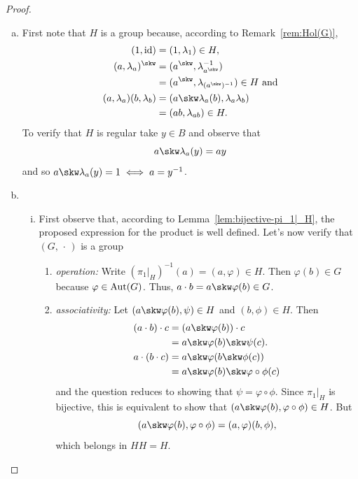 \begin{proof}${}$
    \begin{enumerate}[a),font=\upshape]
        \item First note that $H$ is a group because, according to Remark~\ref{rem:Hol(G)},
        \begin{align*}
            (1,\id) &= (1,\lambda_1)\in H,\\
            (a,\lambda_a)^\skw &= (a^\skw,\lambda^{-1}_{a^\skw})\\
                &= (a^\skw,\lambda_{(a^\skw)^{-1}})\in H
                \text{ and}\\
            (a,\lambda_a)(b,\lambda_b)
                &= (a\skw \lambda_a(b),\lambda_a\lambda_b)\\
                &= (ab,\lambda_{ab})\in H.
        \end{align*}
        To verify that $H$ is regular take $y\in B$ and observe that
        $$
            a\skw\lambda_a(y)=ay
        $$
        and so $a\skw\lambda_a(y)=1\iff a=y^{-1}$.

        \item ${}$
        \begin{enumerate}[i),font=\upshape]
            \item First observe that, according to Lemma~\ref{lem:bijective-pi_1|_H}, the proposed expression for the product is well defined. Let's now verify that $(G,\,\cdot\,)$ is a group
            \begin{enumerate}[-]
                \item \textit{operation:} Write $(\pi_1|_H)^{-1}(a)=(a,\varphi)\in H$. Then $\varphi(b)\in G$ because $\varphi\in{\rm Aut}(G)$. Thus, $a\cdot b = a\skw\varphi(b)\in G$.
                \item \textit{associativity:} Let $(a\skw\varphi(b),\psi)\in H$ and $(b,\phi)\in H$. Then
                \begin{align*}
                    (a\cdot b)\cdot c
                        &= (a\skw\varphi(b))\cdot c\\
                        &= a\skw\varphi(b)\skw\psi(c).\\
                    a\cdot(b\cdot c)
                        &= a\skw\varphi(b\skw\phi(c))\\
                        &= a\skw\varphi(b)\skw\varphi\circ\phi(c)
                \end{align*}
                and the question reduces to showing that $\psi=\varphi\circ\phi$. Since $\pi_1|_H$ is bijective, this is equivalent to show that $(a\skw\varphi(b),\varphi\circ\phi)\in H$. But
                $$
                    (a\skw\varphi(b),\varphi\circ\phi) = (a,\varphi)(b,\phi),
                $$
                which belongs in $HH=H$.


\end{enumerate}
\end{enumerate}
\end{enumerate}
\end{proof}
